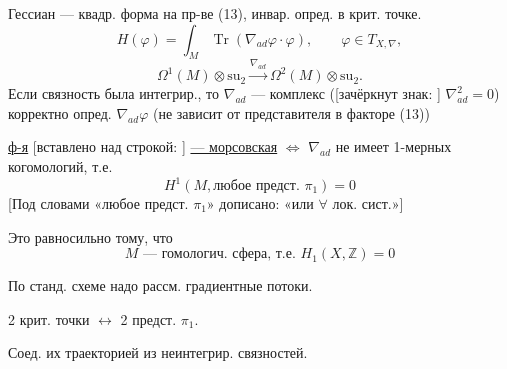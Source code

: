 Гессиан — квадр. форма на пр-ве (13), инвар.
опред. в крит. точке.
\begin{equation*}
H(\varphi)=\int_M\operatorname{Tr}(\nabla_{ad}\varphi\cdot\varphi),
\qquad \varphi\in T_{X,\nabla}, \tag{14}
\end{equation*}
\begin{equation*}
\Omega^1(M)\otimes\mathrm{su}_2
\overset{\nabla_{ad}}{\longrightarrow}
\Omega^2(M)\otimes\mathrm{su}_2. \tag{15}
\end{equation*}
Если связность была интегрир., то $\nabla_{ad}$ — комплекс
([зачёркнут знак:
]
$\nabla_{ad}^{2}=0$)
корректно опред. $\nabla_{ad}\varphi$ (не зависит от представителя
в факторе (13))

\underline{ф-я} [вставлено над строкой:
]
\underline{— морсовская} $\Longleftrightarrow$ $\nabla_{ad}$ не имеет
1-мерных когомологий, т.е.
\begin{equation*}
H^1(M,\text{любое предст. }\pi_1)=0 \tag{16}
\end{equation*}
[Под словами «любое предст. $\pi_1$» дописано: «или $\forall$ лок. сист.»]

Это равносильно тому, что
\begin{equation*}
M\text{ — гомологич. сфера, т.е. }H_1(X,\mathbb Z)=0 \tag{17}
\end{equation*}

По станд. схеме надо рассм. градиентные потоки.

2 крит. точки $\longleftrightarrow$ 2 предст. $\pi_1$.

Соед. их траекторией из неинтегрир. связностей.

